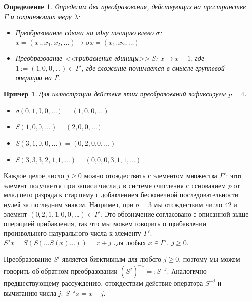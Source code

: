 \documentclass[14pt, a4paper, russian]{report}
\newtheorem{definition}{\indent Определение}
\newtheorem*{example}{\indent Пример}
\begin{document}
\begin{definition} Определим два преобразования, действующих на пространстве $\Gamma$ и сохраняющих меру $\lambda$:
\begin{itemize}
\item Преобразование сдвига на одну позицию влево $\sigma$: $x=\left(x_0, x_1, x_2, \ldots \right) \mapsto \sigma x = \left(x_1, x_2, \ldots \right)$
\item Преобразование <<прибавления единицы>> $S$: $x \mapsto x + 1$, где $1:=(1,0,0,\ldots) \in \Gamma'$, где сложение понимается в смысле групповой операции на $\Gamma$. 
\end{itemize}
\end{definition}
\begin{example}
Для иллюстрации действия этих преобразований зафиксируем $p=4$. 
\begin{itemize}
\item $\sigma (0,1,0,0,\ldots) = (1, 0, 0, \ldots)$
\item $S(1,0,0,\ldots) = (2,0,0,\ldots)$
\item $S(3,1,0,0,\ldots) = (0,2,0,0,\ldots)$
\item $S(3,3,3,2,1,1,\ldots)=(0,0,0,3,1,1,\ldots)$
\end{itemize}
\end{example}

Каждое целое число $j \ge 0$ можно отождествить с элементом множества $\Gamma'$: этот элемент получается при записи числа $j$ в системе счисления с основанием $p$ от младшего разряда к старшему с добавлением бесконечной последовательности нулей за последним знаком. Например, при $p=3$ мы отождествим число $42$ и элемент $(0,2,1,1,0,0,\ldots) \in \Gamma'$. Это обозначение согласовано с описанной выше операцией прибавления, так что мы можем говорить о прибавлении произвольного натурального числа к элементу $\Gamma'$: $S^j x = S(S(\ldots S(x)\ldots)) = x + j$ для любых $x \in \Gamma',\ j \ge 0$.

Преобразование $S^j$ является биективным для любого $j \ge 0$, поэтому мы можем говорить об обратном преобразовании $(S^j)^{-1} =: S^{-j}$. Аналогично предшествующему рассуждению, отождествим действие оператора $S^{-j}$ и вычитанию числа $j$: $S^{-j} x = x - j$.
\end{document}
